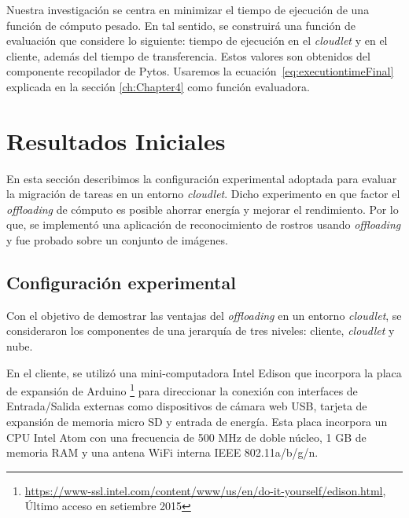 Nuestra investigación se centra en minimizar el tiempo de ejecución de una función de cómputo pesado. En tal sentido, se construirá una función
de evaluación que considere lo siguiente: tiempo de ejecución en el \textit{cloudlet} y en el cliente, además del tiempo de transferencia. 
Estos valores son obtenidos del componente recopilador de Pytos. Usaremos la ecuación~\ref{eq:executiontimeFinal} explicada en la sección 
\ref{ch:Chapter4} como función evaluadora. 


\section{Resultados Iniciales}
\label{sec:evaluation}
En esta sección describimos la configuración experimental adoptada para evaluar la migración de tareas en un entorno \textit{cloudlet}. 
Dicho experimento en que factor el \textit{offloading} de cómputo es posible ahorrar energía y mejorar el rendimiento. Por lo que, se implementó
una aplicación de reconocimiento de rostros usando \textit{offloading} y fue probado sobre un conjunto de imágenes.


\subsection{Configuración experimental}

Con el objetivo de demostrar las ventajas del \textit{offloading} en un entorno \textit{cloudlet}, se consideraron los componentes de una 
jerarquía de tres niveles: cliente, \textit{cloudlet} y nube.

En el cliente, se utilizó una mini-computadora Intel Edison que incorpora la placa de expansión de Arduino 
\footnote{\url{https://www-ssl.intel.com/content/www/us/en/do-it-yourself/edison.html}, Último acceso en setiembre 2015} para direccionar la 
conexión con interfaces de Entrada/Salida externas como dispositivos de cámara web USB, tarjeta de expansión de memoria micro SD y entrada 
de energía. Esta placa incorpora un CPU Intel Atom con una frecuencia de 500 MHz de doble núcleo, 1 GB de memoria RAM y una antena WiFi 
interna IEEE 802.11a/b/g/n. 

